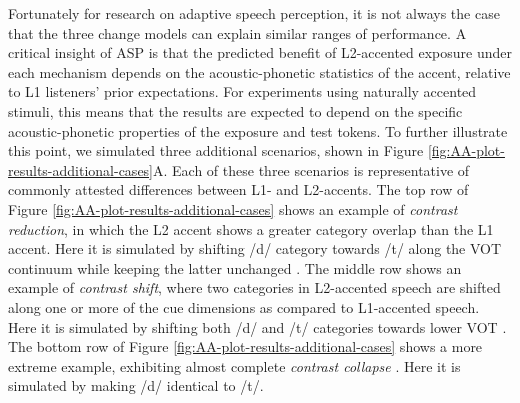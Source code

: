 \documentclass[
  11pt,
  man,floatsintext]{apa6}
\begin{document}
Fortunately for research on adaptive speech perception, it is not always the case that the three change models can explain similar ranges of performance. A critical insight of ASP is that the predicted benefit of L2-accented exposure under each mechanism depends on the acoustic-phonetic statistics of the accent, relative to L1 listeners' prior expectations. For experiments using naturally accented stimuli, this means that the results are expected to depend on the specific acoustic-phonetic properties of the exposure and test tokens. To further illustrate this point, we simulated three additional scenarios, shown in Figure \ref{fig:AA-plot-results-additional-cases}A. Each of these three scenarios is representative of commonly attested differences between L1- and L2-accents. The top row of Figure \ref{fig:AA-plot-results-additional-cases} shows an example of \emph{contrast reduction}, in which the L2 accent shows a greater category overlap than the L1 accent. Here it is simulated by shifting /d/ category towards /t/ along the VOT continuum while keeping the latter unchanged \autocite[as qualitatively attested for, e.g., vowels in Spanish-accented English,][]{wade2007}. The middle row shows an example of \emph{contrast shift}, where two categories in L2-accented speech are shifted along one or more of the cue dimensions as compared to L1-accented speech. Here it is simulated by shifting both /d/ and /t/ categories towards lower VOT \autocite[qualitatively attested for, e.g., word-initial stops in French-accented English,][]{Sumner2011a}. The bottom row of Figure \ref{fig:AA-plot-results-additional-cases} shows a more extreme example, exhibiting almost complete \emph{contrast collapse} \autocite[similar to the loss of the /s/-// contrast that can occur in Mandarin-accented English,][]{zheng-samuel2020}. Here it is simulated by making /d/ identical to /t/.
\end{document}
